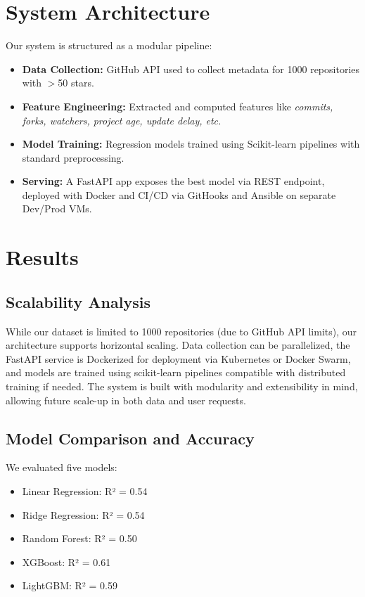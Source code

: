 \documentclass[12pt,a4paper]{article}
\begin{document}
\section{System Architecture}
Our system is structured as a modular pipeline:
\begin{itemize}
    \item \textbf{Data Collection:} GitHub API used to collect metadata for 1000 repositories with $>$50 stars.
    \item \textbf{Feature Engineering:} Extracted and computed features like \textit{commits, forks, watchers, project age, update delay, etc.}
    \item \textbf{Model Training:} Regression models trained using Scikit-learn pipelines with standard preprocessing.
    \item \textbf{Serving:} A FastAPI app exposes the best model via REST endpoint, deployed with Docker and CI/CD via GitHooks and Ansible on separate Dev/Prod VMs.
\end{itemize}

\section{Results}
\subsection{Scalability Analysis}
While our dataset is limited to 1000 repositories (due to GitHub API limits), our architecture supports horizontal scaling. Data collection can be parallelized, the FastAPI service is Dockerized for deployment via Kubernetes or Docker Swarm, and models are trained using scikit-learn pipelines compatible with distributed training if needed. The system is built with modularity and extensibility in mind, allowing future scale-up in both data and user requests.

\subsection{Model Comparison and Accuracy}
We evaluated five models:
\begin{itemize}[noitemsep]
    \item Linear Regression: R² = 0.54
    \item Ridge Regression: R² = 0.54
    \item Random Forest: R² = 0.50
    \item XGBoost: R² = 0.61
    \item LightGBM: R² = 0.59
\end{itemize}
\end{document}
